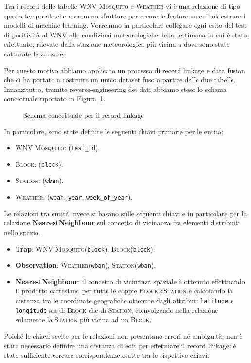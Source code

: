 Tra i record delle tabelle \textsc{WNV Mosquito} e \textsc{Weather} vi è una 
relazione di tipo spazio-temporale che vorremmo sfruttare per creare le 
feature su cui addestrare i modelli di machine learning. Vorremmo in 
particolare collegare ogni esito del test di positività al WNV alle condizioni 
meteorologiche della settimana in cui è stato effettuato, rilevate dalla 
stazione meteorologica più vicina a dove sono state catturate le zanzare.

Per questo motivo abbiamo applicato un processo di record linkage e data fusion 
che ci ha portato a costruire un unico dataset fuso a partire dalle due 
tabelle. Innanzitutto, tramite reverse-engineering dei dati abbiamo steso lo 
schema concettuale riportato in Figura~\ref{fig:er-schema}. 

\begin{figure}[H]
    \centering
    \def\svgwidth{\columnwidth}
    \scalebox{.5}{
        
    }
    \caption{Schema concettuale per il record linkage}
    \label{fig:er-schema}
\end{figure}

In particolare, sono state definite le seguenti chiavi primarie per le entità:

\begin{itemize}
    \item \textsc{WNV Mosquito}: (\texttt{test\_id}).

    \item \textsc{Block}: (\texttt{block}).
    
    \item \textsc{Station}: (\texttt{wban}).
    
    \item \textsc{Weather}: (\texttt{wban}, \texttt{year}, 
    \texttt{week\_of\_year}).
\end{itemize}

Le relazioni tra entità invece si basano sulle seguenti chiavi e in particolare 
per la relazione \textbf{NearestNeighbour} sul concetto di vicinanza fra 
elementi distribuiti nello spazio.

\begin{itemize}
    \item \textbf{Trap}: \textsc{WNV Mosquito}(\texttt{block}), 
    \textsc{Block}(\texttt{block}).

    \item \textbf{Observation}:  \textsc{Weather}(\texttt{wban}), 
    \textsc{Station}(\texttt{wban}).
    
    \item \textbf{NearestNeighbour}: il concetto di vicinanza spaziale è 
    ottenuto effettuando il prodotto cartesiano per tutte le coppie
    \textsc{Block}$\times$\textsc{Station} e calcolando la distanza tra le 
    coordinate geografiche ottenute dagli attributi \texttt{latitude} e 
    \texttt{longitude} sia di \textsc{Block} che di \textsc{Station},
    coinvolgendo nella relazione solamente la \textsc{Station} più vicina ad 
    un \textsc{Block}.
\end{itemize}

Poiché le chiavi scelte per le relazioni non presentano errori né ambiguità, 
non è stato necessario definire una distanza di edit per effettuare il record 
linkage: è stato sufficiente cercare corrispondenze esatte tra le rispettive 
chiavi.
